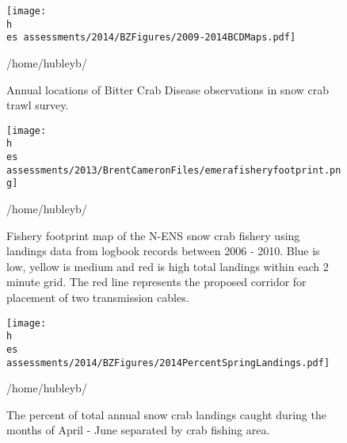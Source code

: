 \documentclass[11pt]{article}
\newcommand{\D}{.}
\newcommand{\h}{/home/hubleyb/}
\newcommand{\es}{bio.data/bio.snowcrab/}
\begin{document}
\begin{figure}
\centering
\texttt{[image: \\h \\es assessments/2014/BZFigures/2009-2014BCDMaps.pdf]}
\caption{Annual locations of Bitter Crab Disease observations in snow crab trawl survey.}
\h \end{figure}



%


\begin{figure}
\centering
\texttt{[image: \\h \\es assessments/2013/BrentCameronFiles/emerafisheryfootprint.png]}
\caption{Fishery footprint map of the N-ENS snow crab fishery using landings data from logbook records between 2006 - 2010. Blue is low, yellow is medium and red is high total landings within each 2 minute grid. The red line represents the proposed corridor for placement of two transmission cables.  }
\h \end{figure}
\clearpage
\begin{figure}
\centering
\texttt{[image: \\h \\es assessments/2014/BZFigures/2014PercentSpringLandings.pdf]}
\caption{The percent of total annual snow crab landings caught during the months of April - June separated by crab fishing area.}
\h \end{figure}
\clearpage
\end{document}

